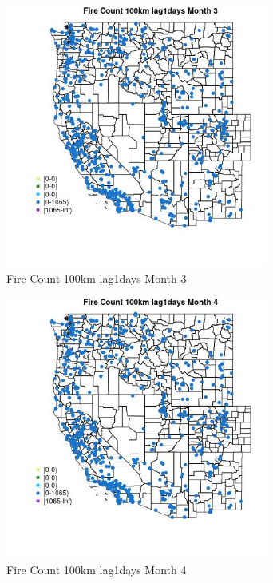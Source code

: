 \begin{figure} 
\centering  
\includegraphics[width=0.77\textwidth]{Code_Outputs/Report_ML_input_PM25_Step4_part_f_de_duplicated_aveswNAs_MapObsMo3Fire_Count_100km_lag1days.jpg} 
\caption{\label{fig:Report_ML_input_PM25_Step4_part_f_de_duplicated_aveswNAsMapObsMo3Fire_Count_100km_lag1days}Fire Count 100km lag1days Month 3} 
\end{figure} 
 

\begin{figure} 
\centering  
\includegraphics[width=0.77\textwidth]{Code_Outputs/Report_ML_input_PM25_Step4_part_f_de_duplicated_aveswNAs_MapObsMo4Fire_Count_100km_lag1days.jpg} 
\caption{\label{fig:Report_ML_input_PM25_Step4_part_f_de_duplicated_aveswNAsMapObsMo4Fire_Count_100km_lag1days}Fire Count 100km lag1days Month 4} 
\end{figure} 
 

